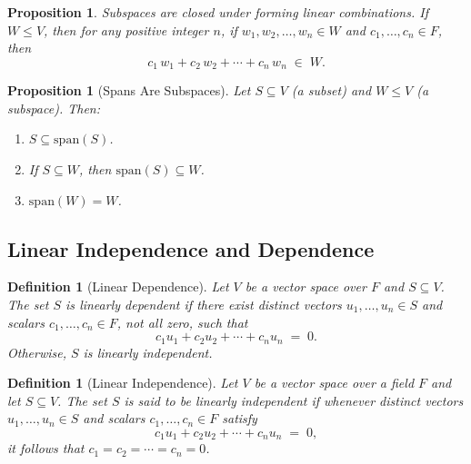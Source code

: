 \documentclass[12pt]{article}
\theoremstyle{break}             %
\newtheorem{prop}[thm]{Proposition}%
\newtheorem{defn}[thm]{Definition}
\begin{document}
\begin{prop}
Subspaces are closed under forming linear combinations.  
If \(W \le V\), then for any positive integer \(n\), if \(w_1,w_2,\dots,w_n \in W\) and \(c_1,\dots,c_n \in F\), then
\[
c_1\,w_1 + c_2\,w_2 + \cdots + c_n\,w_n \;\in\; W.
\]
\end{prop}

\begin{prop}[Spans Are Subspaces]
Let \(S \subseteq V\) (a subset) and \(W \le V\) (a subspace). Then:
\begin{enumerate}
\item \(S \subseteq \mathrm{span}(S)\).
\item If \(S \subseteq W\), then \(\mathrm{span}(S) \subseteq W\).
\item \(\mathrm{span}(W) = W\).
\end{enumerate}
\end{prop}

\subsection{Linear Independence and Dependence}

\begin{defn}[Linear Dependence]
Let \(V\) be a vector space over \(F\) and \(S\subseteq V\).  The set \(S\) is \emph{linearly dependent} if there exist distinct vectors \(u_1,\dots,u_n\in S\) and scalars \(c_1,\dots,c_n\in F\), not all zero, such that
\[
c_1u_1 + c_2u_2 + \cdots + c_nu_n \;=\; 0.
\]
Otherwise, \(S\) is \emph{linearly independent}.
\end{defn}

\begin{defn}[Linear Independence]
Let \(V\) be a vector space over a field \(F\) and let \(S\subseteq V\).  The set \(S\) is said to be \emph{linearly independent} if whenever distinct vectors \(u_1,\dots,u_n\in S\) and scalars \(c_1,\dots,c_n\in F\) satisfy
\[
c_1u_1 + c_2u_2 + \cdots + c_nu_n \;=\; 0,
\]
it follows that \(c_1 = c_2 = \cdots = c_n = 0\).
\end{defn}
\end{document}
